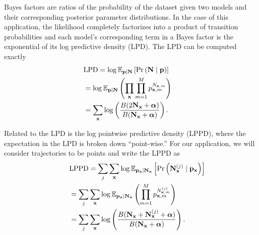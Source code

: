 \documentclass{IOS-Book-Article}
\newcommand{\bN}{\mathbf{N}}
\newcommand{\bx}{\mathbf{x}}
\newcommand{\bp}{\mathbf{p}}
\newcommand{\balpha}{{\boldsymbol\alpha}}
\begin{document}
Bayes factors are ratios of the probability of the dataset given two models and their corresponding posterior parameter distributions. In the case of this application, the likelihood completely factorizes into  a product of transition probabilities and each model's corresponding term in a Bayes factor is the exponential of its log predictive density (LPD). The LPD can be computed exactly
\begin{align}
\lefteqn{\textrm{LPD} = \log\mathbb{E}_{\bp\vert\bN}  \left[     \Pr\left(\mathbf{N}  \mid \bp \right) \right] } \nonumber\\
&=  \log \mathbb{E}_{\bp\vert\bN} \left( \prod_\bx  \prod_{m=1}^{M} p_{\bx,m}^{N_{\bx,m}} \right) \nonumber \\
&= \sum_{\bx} \log\left( \frac{B(2\bN_\bx+\balpha)}{B(\bN_\bx +\balpha )} \right).
\end{align}

Related to the LPD is the log pointwise predictive density (LPPD), where the expectation in
the LPD is broken down ``point-wise.'' For our application, we will consider trajectories to be
points and write the LPPD as
\begin{align}
\lefteqn{\textrm{LPPD} = \sum_j\sum_{\bx}\log\mathbb{E}_{\bp_\bx\vert\bN_\bx}  \left[     \Pr\left(\mathbf{N}^{(j)}_{\bx} \mid \bp_\bx \right) \right] } \nonumber\\
&= \sum_j\sum_{\mathbf{x}} \log \mathbb{E}_{\bp_\bx\vert\bN_\bx} \left(%
 \prod_{m=1}^{M} p_{\bx,m}^{N^{(j)}_{\bx,m}} \right) \nonumber\\
&=\sum_j \sum_{\bx}  \log\left(  \frac{B(\bN_\bx +\bN_{\bx}^{(j)} +\balpha)}{B(\bN_\bx +\balpha)} \right).
\end{align}
\end{document}
